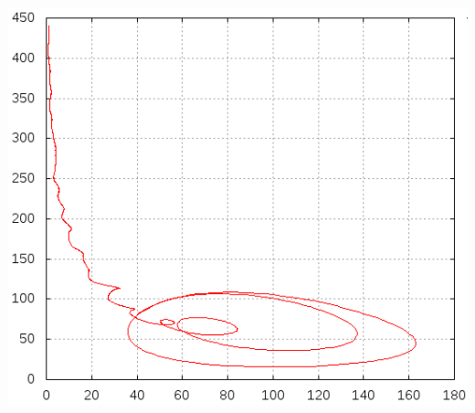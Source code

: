 \documentclass[11pt]{article}
\begin{document}
\begin{minipage}[b]{0.6\textwidth}
\includegraphics[width=\textwidth]{Graphiken/ppm42ham.png}
\end{minipage}
\end{document}
